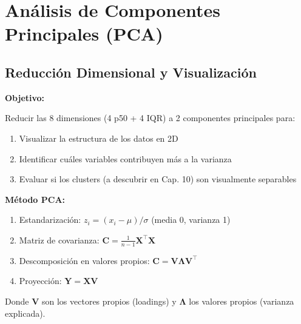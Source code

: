 \documentclass[12pt,letterpaper,twoside]{report}
\newcommand{\mat}[1]{\mathbf{#1}}
\begin{document}
\section{Análisis de Componentes Principales (PCA)}

\subsection{Reducción Dimensional y Visualización}

\begin{hipotesisbox}
\textbf{Objetivo:}

Reducir las 8 dimensiones (4 p50 + 4 IQR) a 2 componentes principales para:
\begin{enumerate}[noitemsep]
    \item Visualizar la estructura de los datos en 2D
    \item Identificar cuáles variables contribuyen más a la varianza
    \item Evaluar si los clusters (a descubrir en Cap. 10) son visualmente separables
\end{enumerate}
\end{hipotesisbox}

\begin{estadisticobox}
\textbf{Método PCA:}

\begin{enumerate}[noitemsep]
    \item Estandarización: $z_i = (x_i - \mu) / \sigma$ (media 0, varianza 1)
    \item Matriz de covarianza: $\mat{C} = \frac{1}{n-1}\mat{X}^\top\mat{X}$
    \item Descomposición en valores propios: $\mat{C} = \mat{V}\mat{\Lambda}\mat{V}^\top$
    \item Proyección: $\mat{Y} = \mat{X}\mat{V}$
\end{enumerate}

Donde $\mat{V}$ son los vectores propios (loadings) y $\mat{\Lambda}$ los valores propios (varianza explicada).
\end{estadisticobox}
\end{document}
